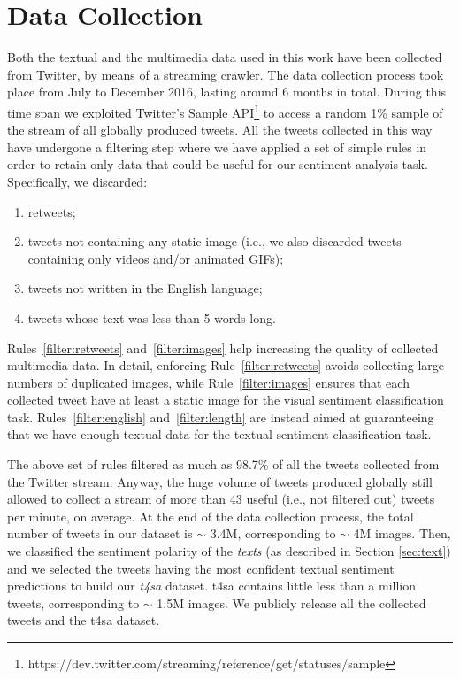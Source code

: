 \section{Data Collection}
\label{sec:vsa:dataset}
Both the textual and the multimedia data used in this work have been collected from Twitter, by means of a streaming crawler. The data collection process took place from July to December 2016, lasting around 6 months in total. During this time span we exploited Twitter's Sample API\footnote{https://dev.twitter.com/streaming/reference/get/statuses/sample} to access a random 1\% sample of the stream of all globally produced tweets. All the tweets collected in this way have undergone a filtering step where we have applied a set of simple rules in order to retain only data that could be useful for our sentiment analysis task. Specifically, we discarded:
\begin{enumerate}
\item\label{filter:retweets} retweets;
\item\label{filter:images} tweets not containing any static image (i.e., we also discarded tweets containing only videos and/or animated GIFs);
\item\label{filter:english} tweets not written in the English language;
\item\label{filter:length} tweets whose text was less than 5 words long.
\end{enumerate}
Rules~\ref{filter:retweets} and~\ref{filter:images} help increasing the quality of collected multimedia data.
In detail, enforcing Rule~\ref{filter:retweets} avoids collecting large numbers of duplicated images, while Rule~\ref{filter:images} ensures that each collected tweet have at least a static image for the visual sentiment classification task. Rules~\ref{filter:english} and~\ref{filter:length} are instead aimed at guaranteeing that we have enough textual data for the textual sentiment classification task.

The above set of rules filtered as much as 98.7\% of all the tweets collected from the Twitter stream. Anyway, the huge volume of tweets produced globally still allowed to collect a stream of more than 43 useful (i.e., not filtered out) tweets per minute, on average. At the end of the data collection process, the total number of tweets in our dataset
is $\sim$ 3.4M, corresponding to $\sim$ 4M images. Then, we classified the sentiment polarity of the \emph{texts} (as described in Section \ref{sec:text}) and we selected the tweets having the most confident textual sentiment predictions to build our \emph{\acrfull{t4sa}} dataset. \gls{t4sa} contains %
little less than a million tweets, corresponding to $\sim$ 1.5M images.
We publicly release {all the collected tweets} and the \gls{t4sa} dataset.%


